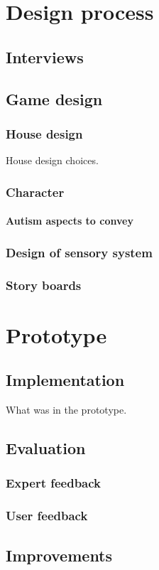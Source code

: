 \documentclass[11pt]{report}
\begin{document}
\chapter{Design process}
\section{Interviews}

\section{Game design}
\subsection{House design}
House design choices. 
\subsection{Character}
\subsubsection{Autism aspects to convey}
\subsection{Design of sensory system}
\subsection{Story boards}

\chapter{Prototype}

\section{Implementation}
What was in the prototype.
\section{Evaluation}
\subsection{Expert feedback}
\subsection{User feedback}
\section{Improvements}
\end{document}
